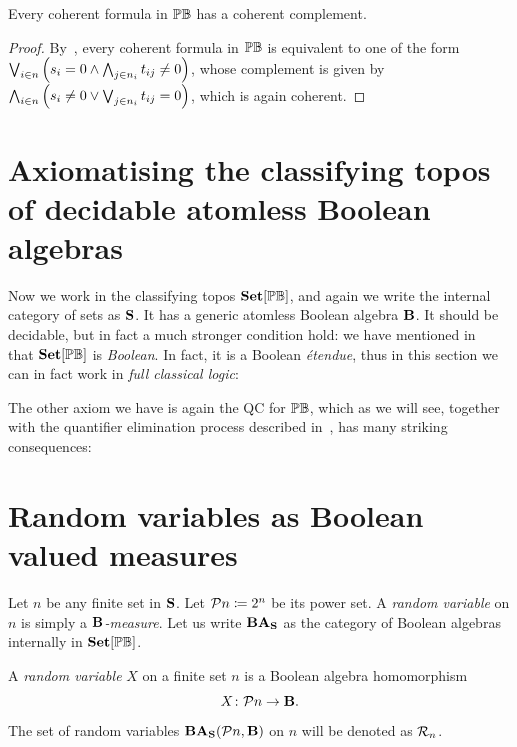 \begin{corollary}\label{cor:complementofPB}
  Every coherent formula in $\mathbb{PB}$ has a coherent complement.
\end{corollary}
\begin{proof}
  By~, every coherent formula in $\mathbb{PB}$ is equivalent to one of the form $\bigvee_{i\in n} \left(s_i = 0 \wedge \bigwedge_{j\in n_i} t_{ij} \neq 0\right)$, whose complement is given by $\bigwedge_{i\in n} \left(s_i \neq 0 \vee \bigvee_{j\in n_i} t_{ij} = 0\right)$, which is again coherent. 
\end{proof}


\section{Axiomatising the classifying topos of decidable atomless Boolean algebras}

Now we work in the classifying topos $\mathbf{Set}[\mathbb{PB}]$, and again we write the internal category of sets as $\mathbf{S}$. It has a generic atomless Boolean algebra $\mathbf{B}$. It should be decidable, but in fact a much stronger condition hold: we have mentioned in~ that $\mathbf{Set}[\mathbb{PB}]$ is \emph{Boolean}. In fact, it is a Boolean \emph{\'etendue}, thus in this section we can in fact work in \emph{full classical logic}:

\PrintAxiomBL

The other axiom we have is again the \gls{QC} for $\mathbb{PB}$, which as we will see, together with the quantifier elimination process described in~, has many striking consequences:

\PrintAxiomSQCB

\section{Random variables as Boolean valued measures}

Let $n$ be any finite set in $\mathbf{S}$. Let $\mathcal{P}n \coloneq 2^n$ be its power set. A \emph{random variable} on $n$ is simply a \emph{$\mathbf{B}$-measure}. Let us write $\mathbf{BA}_{\mathbf{S}}$ as the category of Boolean algebras internally in $\mathbf{Set}[\mathbb{PB}]$.

\begin{definition}\label{def:randomvariable}
  A \emph{random variable} $X$ on a finite set $n$ is a Boolean algebra homomorphism 
  \[ X \colon \mathcal{P}n \to \mathbf{B}. \]
  The set of random variables $\mathbf{BA}_{\mathbf{S}}(\mathcal{P}n,\mathbf{B})$ on $n$ will be denoted as $\mathcal{R}_n$. 
\end{definition}


